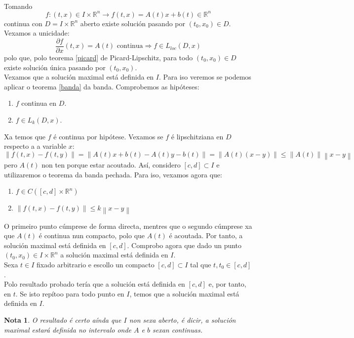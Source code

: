 \documentclass[11pt, a4paper,twoside]{article}
\makeatletter
\theoremstyle{theorem-style}  %
\renewenvironment{proof}[1][\proofname]{\par
	\pushQED{\qed}%
	\normalfont \topsep6\p@\@plus6\p@\relax
	\list{}{%
		\settowidth{\leftmargin}{\quad:\hskip\labelsep}%
		\setlength{\labelwidth}{0pt}%
		\setlength{\itemindent}{-\leftmargin}%
	}%
	\item[\hskip\labelsep\itshape#1\@addpunct{:}]\ignorespaces
}{%
	\popQED\endlist\@endpefalse
}
\theoremstyle{definition-style}
\newtheorem*{note}{Nota} %
\theoremstyle{example-style}
\providecommand{\norm}[1]{\left\lVert#1\right\rVert} %
\makeatother
\begin{document}
\begin{proof}\ \\
	Tomando
	\[f:(t, x) \in I \times \mathbb{R}^n \longrightarrow f(t,x)=A(t)x+b(t)\in\mathbb{R}^n\]
	continua con $D = I \times \mathbb{R}^n$ aberto existe solución pasando por $(t_0, x_0) \in D$. Vexamos a unicidade:
	\[\frac{\partial f}{\partial x} (t, x) = A(t) \text{ continua} \Rightarrow f \in L_{loc} (D, x)\]
	polo que, polo teorema \ref{picard} de Picard-Lipschitz, para todo $ (t_0, x_0) \in D$ existe solución única pasando por $(t_0, x_0)$. \\
	Vexamos que a solución maximal está definida en $I$. Para iso veremos se podemos aplicar o teorema \ref{banda} da banda. Comprobemos as hipóteses:
	\begin{enumerate}
		\item $f$ continua en $D$.
		\item $f \in L_k (D, x)$.
	\end{enumerate}
	Xa temos que $f$ é continua por hipótese. Vexamos se $f$ é lipschitziana en $D$ respecto a a variable $x$:
	\[\norm{f(t, x) - f(t, y)} = \norm{A(t)x + b(t) - A(t)y - b(t)} = \norm{A(t) (x-y)} \leq \norm{A(t)} \norm{x - y} \]
	pero $A(t)$ non ten porque estar acoutado. Así, considero $[c, d] \subset I$ e utilizaremos o teorema da banda pechada. Para iso, vexamos agora que:
	\begin{enumerate}
		\item $f \in C([c, d] \times \mathbb{R}^n)$
		\item $\norm{f(t, x) - f(t, y)} \leq k \norm{x - y}$
	\end{enumerate}
	O primeiro punto cúmprese de forma directa, mentres que o segundo cúmprese xa que $A(t)$ é continua nun compacto, polo que $A(t)$ é acoutada. Por tanto, a solución maximal está definida en $[c, d]$. Comprobo agora que dado un punto $(t_0, x_0) \in I \times \mathbb{R}^n$ a solución maximal está definida en $I$. \\
	Sexa $t \in I$ fixado arbitrario e escollo un compacto $[c, d]\subset I$ tal que $t, t_0 \in [c, d]$. \\
	Polo resultado probado tería que a solución está definida en $[c, d]$ e, por tanto, en $t$. Se isto repítoo para todo punto en $I$, temos que a solución maximal está definida en $I$.
\end{proof}
\begin{note}
	O resultado é certo aínda que $I$ non sexa aberto, é dicir, a solución maximal estará definida no intervalo onde $A$ e $b$ sexan continuas.
\end{note}
\end{document}
